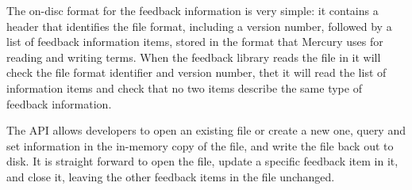 The on-disc format for the feedback information is very simple:
it contains a header that identifies the file format,
including a version number,
followed by a list of feedback information items,
stored in the format that Mercury uses for reading and writing
terms.
When the feedback library reads the file in
it will check the file format identifier and version number,
thet it will read the list of information items and check that no two
items describe the same type of feedback information.

The API allows developers to open an existing file or create a new one,
query and set information in the in-memory copy of the file,
and write the file back out to disk.
It is straight forward to open the file,
update a specific feedback item in it,
and close it,
leaving the other feedback items in the file unchanged.



